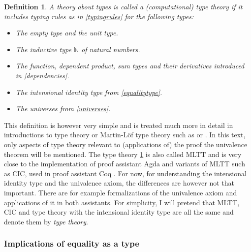 \documentclass[12pt,a4paper,twoside,xetex]{book}
\newcommand{\keyword}[1]{\emph{#1}\index{#1}}
\newtheorem{definition}[theorem]{Definition}
\begin{document}
\begin{definition}\label{typetheory}
  A theory about types is called a (computational) \keyword{type theory} if it 
includes typing rules as in \cref{typingrules} for the following types:
  \begin{itemize}
   \item The empty type and the unit type.
   \item The inductive type $\mathbb{N}$ of natural numbers.
   \item The function, dependent product, sum types and their derivatives 
introduced in \cref{dependencies}.
   \item The intensional identity type from \cref{equalitytype}.
   \item The universes from \cref{universes}.
  \end{itemize}
\end{definition}

This definition is however very simple and is treated much more in detail in 
introductions to type theory or Martin-L\"of type theory such as 
\cite{Palmgren2014} or \cite{Voevodsky2013}. In this text, only aspects of type 
theory relevant to (applications of) the proof the univalence theorem will be 
mentioned. The type theory \cref{typetheory} is also called MLTT and is very close to the implementation of proof assistant Agda \cite{Abel2019} and variants of MLTT such as CIC, used in proof assistant Coq \cite{Arias2019}. For now, for understanding the intensional 
identity type and the univalence axiom, the differences are however not that 
important. There are for example formalizations of the univalence axiom and 
applications of it in both assistants. For simplicity, I will pretend that MLTT, 
CIC and type theory with the intensional identity type are all the same and 
denote them by \keyword{type theory}.

\subsubsection{Implications of equality as a type}
\end{document}

